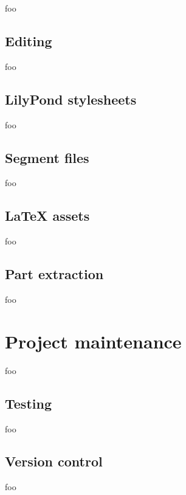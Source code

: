 foo

\subsection{Editing}

foo

\subsection{LilyPond stylesheets}

foo

\subsection{Segment files}

foo

\subsection{LaTeX assets}

foo

\subsection{Part extraction}

foo

\section{Project maintenance}

foo

\subsection{Testing}

foo

\subsection{Version control}

foo
